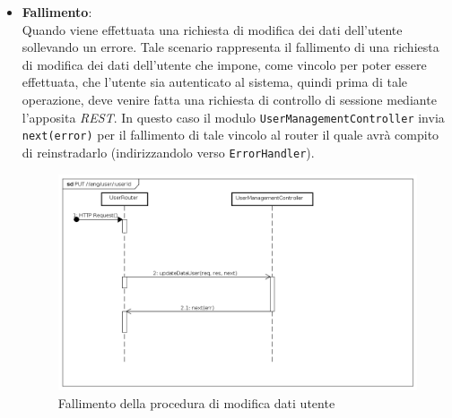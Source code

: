 \begin{itemize}
\item \textbf{Fallimento}:
\\
Quando viene effettuata una richiesta di modifica dei dati dell'utente sollevando un errore. Tale scenario rappresenta il fallimento di una richiesta di modifica dei dati dell'utente che impone, come vincolo per poter essere effettuata, che l'utente sia autenticato al sistema, quindi prima di tale operazione, deve venire fatta una richiesta di controllo di sessione mediante l'apposita \textit{REST}. In questo caso il modulo \texttt{UserManagementController} invia \texttt{next(error)} per il fallimento di tale vincolo al router il quale avrà compito di reinstradarlo (indirizzandolo verso \texttt{ErrorHandler}).
\label{Fallimento della procedura di modifica dati utente}
\begin{figure}[ht]
	\centering
	\includegraphics[scale=0.40]{UML/DiagrammiDiSequenza/Back-end/PUT_LangUserUseridFailure.png}
	
	\caption{Fallimento della procedura di modifica dati utente}
\end{figure}
\FloatBarrier
\end{itemize}

